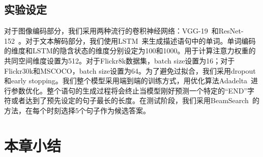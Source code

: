 \subsection{实验设定}
对于图像编码部分，我们采用两种流行的卷积神经网络：VGG-19~\cite{simonyan2015very}和ResNet-152~\cite{he2016deep}。对于文本解码部分，我们使用LSTM~\cite{hochreiter1997long}来生成描述语句中的单词。单词编码的维度和LSTM的隐含状态的维度分别设定为100和1000。用于计算注意力权重的共同空间维度设置为512。对于Flickr8k数据集，batch size设置为16；对于Flickr30k和MSCOCO，batch size设置为64。为了避免过拟合，我们采用dropout和early stopping。我们整个模型采用端到端的训练方式，用优化算法Adadelta~\cite{zeiler2012adadelta}进行参数优化。整个语句的生成过程将会终止当模型刚好预测一个特定的“END”字符或者达到了预先设定的句子最长的长度。在测试阶段，我们采用BeamSearch~\cite{vinyals2015show}的方法，在每个时刻选择5个句子作为候选答案。



\section{本章小结}